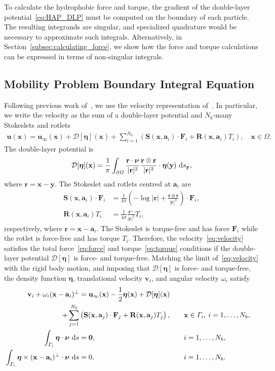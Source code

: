 \documentclass[lineno]{jfm}
\renewcommand{\aa}{\mathbf{a}}
\newcommand{\bd}{\partial}
\newcommand{\DD}{\mathcal{D}}
\newcommand{\eeta}{\boldsymbol{\eta}}
\newcommand{\FF}{\mathbf{F}}
\newcommand{\nnu}{\boldsymbol{\nu}}
\newcommand{\rr}{\mathbf{r}}
\newcommand{\RR}{\mathbf{R}}
\renewcommand{\SS}{\mathbf{S}}
\newcommand{\xx}{\mathbf{x}}
\newcommand{\uu}{\mathbf{u}}
\renewcommand{\vv}{\mathbf{v}}
\newcommand{\yy}{\mathbf{y}}
\begin{document}
To calculate the hydrophobic force and torque, the gradient of the
double-layer potential~\eqref{eq:HAP_DLP} must be computed on the
boundary of each particle. The resulting integrands are singular, and
specialized quadrature would be necessary to approximate such integrals.
Alternatively, in Section~\ref{subsec:calculating_force}, we show how
the force and torque calculations can be expressed in terms of
non-singular integrals.

\subsection{Mobility Problem Boundary Integral Equation}
Following previous work of~\cite{Lukas19}, we use the velocity
representation of~\cite{pow-mir1987}. In particular, we write the
velocity as the sum of a double-layer potential and $N_b$-many Stokeslets and
rotlets
\begin{align}
  \label{eq:velocity}
  \uu(\xx) = \uu_\infty(\xx) + \DD[\eeta](\xx) + 
    \sum_{i=1}^{N_b} \left(\SS(\xx,\aa_i) \cdot \FF_i + 
    \RR(\xx,\aa_i) T_i\right), \quad \xx \in \Omega.
\end{align}
The double-layer potential is
\begin{align}
  \DD[\eeta](\xx) = \frac{1}{\pi} \int_{\bd\Omega} 
    \frac{\rr \cdot \nnu}{|\rr|^2} \frac{\rr \otimes \rr}{|\rr|^2}
    \cdot \eeta(\yy) \, \dif s_\yy,
\end{align}
where $\rr = \xx - \yy$. The Stokeslet and rotlets centred at $\aa_i$
are
\begin{align}
  \SS(\xx,\aa_i) \cdot \FF_i &= \frac{1}{4\pi} \left(-\log |\rr| + 
    \frac{\rr \otimes \rr}{|\rr|^2}\right) \cdot \FF_i, \\
  \RR(\xx,\aa_i) T_i &= \frac{1}{4\pi} \frac{\rr^\perp}{|\rr|^2} T_i,
\end{align}
respectively, where $\rr = \xx - \aa_i$. The Stokeslet is torque-free
and has force $\FF_i$ while the rotlet is force-free and has torque
$T_i$. Therefore, the velocity~\eqref{eq:velocity} satisfies the total
force~\eqref{eq:force} and torque~\eqref{eq:torque} conditions if the
double-layer potential $\DD[\eeta]$ is force- and torque-free.  Matching
the limit of~\eqref{eq:velocity} with the rigid body motion, and
imposing that $\DD[\eeta]$ is force- and torque-free, the density
function $\eeta$, translational velocity $\vv_i$, and angular velocity
$\omega_i$ satisfy
\begin{alignat}{3}
  \nonumber
  \vv_i + \omega_i (\xx - \aa_i)^\perp &= \uu_\infty(\xx)
    -\frac{1}{2} \eeta(\xx) + \DD[\eeta](\xx) \\
  \label{eq:SKIE}
    + \sum_{j=1}^{N_b} &
    \left(\SS(\xx,\aa_j) \cdot \FF_j + \RR(\xx,\aa_j) T_j\right),
    \quad &&\xx \in \Gamma_i,\: i=1,\ldots,N_b, \\
  \label{eq:mobility1}
  \int_{\Gamma_i} \eeta \cdot \nnu \, \dif s &= {\bf 0}, 
  &&i = 1,\ldots,N_b, \\
  \label{eq:mobility2}
  \int_{\Gamma_i} \eeta\times(\xx-\aa_i)^\perp \cdot \nnu \, \dif s &= 0,
  &&i = 1,\ldots,N_b.
\end{alignat}
\end{document}
